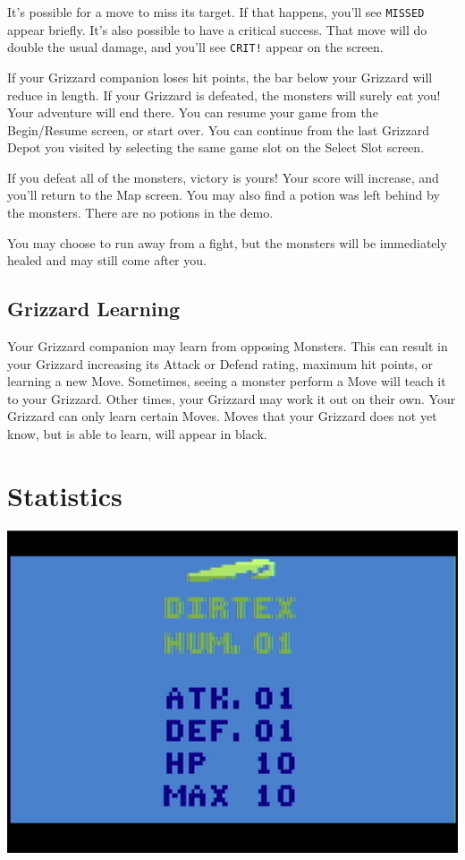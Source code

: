 \documentclass[10pt,twocolumn,openany,article]{memoir}
\begin{document}
It's possible for a move to miss its target. If that happens, you'll see
\texttt{MISSED} appear  briefly. It's also  possible to have  a critical
success.  That move  will do  double the  usual damage,  and you'll  see
\texttt{CRIT!} appear on the screen.

If your Grizzard companion loses hit points, the bar below your Grizzard
will reduce in  length. If your Grizzard is defeated,  the monsters will
surely eat you! Your adventure will end there. \ifdefined\NOSAVE You can
resume your game from the Begin/Resume  screen, or start over. \else You
can continue from  the last Grizzard Depot you visited  by selecting the
same game slot on the Select Slot screen. \fi

If you  defeat all of  the monsters, victory  is yours! Your  score will
increase,  and you'll  return  to  the Map  screen.  You  may also  find
a potion was  left behind by the monsters. \ifdefined\DEMO  There are no
potions in the demo. \fi

You  may choose  to run  away from  a fight,  but the  monsters will  be
immediately healed and may still come after you.

\subsection{Grizzard Learning}

Your  Grizzard companion  may  learn from  opposing  Monsters. This  can
result in your Grizzard increasing  its Attack or Defend rating, maximum
hit points, or learning a new  Move. Sometimes, seeing a monster perform
a Move  will teach it to  your Grizzard. Other times,  your Grizzard may
work it  out on their own.  Your Grizzard can only  learn certain Moves.
Moves that your Grizzard  does not yet know, but is  able to learn, will
appear in black.

\section{Statistics}

\begin{center}
  \includegraphics[width=\columnwidth]{../Manual/StatsScreenshotNTSC.png}
\end{center}
\end{document}
